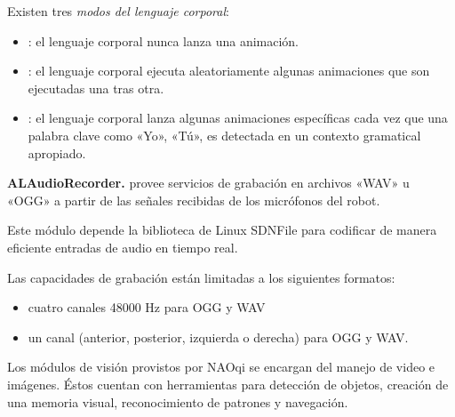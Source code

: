 \begin{sphinxVerbatim}[commandchars=\\\{\}]
\end{sphinxVerbatim}


Existen tres \textit{modos del lenguaje corporal}:
\begin{itemize}
\item {} 
: el lenguaje corporal nunca lanza una animación.

\item {} 
: el lenguaje corporal ejecuta aleatoriamente algunas animaciones que son ejecutadas una tras otra.

\item {} 
: el lenguaje corporal lanza algunas animaciones específicas cada vez que una palabra clave como «Yo», «Tú», es detectada en un contexto gramatical apropiado.

\end{itemize}


\textbf{ALAudioRecorder.}
\label{\detokenize{chapter_one/naoqi:alaudiorecorder}}
 provee servicios de grabación en archivos «WAV»
u «OGG» a partir de las señales recibidas de los micrófonos del robot.

Este módulo depende la biblioteca de Linux SDNFile para
codificar de manera eficiente entradas de audio en tiempo real.

Las capacidades de grabación están limitadas a los siguientes
formatos:
\begin{itemize}
\item {} 
cuatro canales 48000 Hz para OGG y WAV

\item {} 
un canal (anterior, posterior, izquierda o derecha) para OGG y WAV.

\end{itemize}

Los módulos de visión provistos por NAOqi se encargan del manejo de video e
imágenes.
Éstos cuentan con herramientas para detección de objetos,
creación de una memoria visual, reconocimiento de patrones
y navegación.

